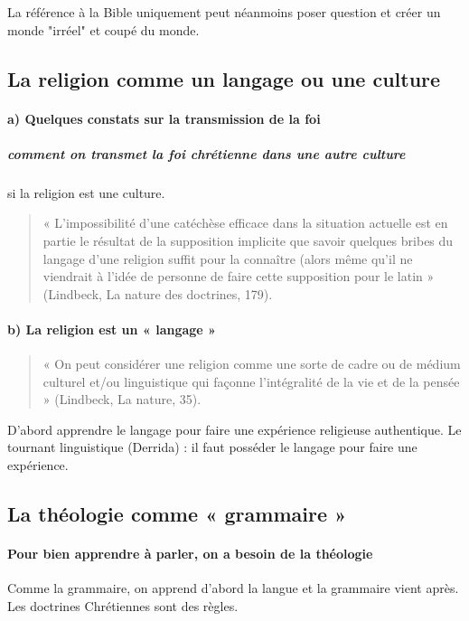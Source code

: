La référence à la Bible uniquement peut néanmoins poser question et créer un monde "irréel" et coupé du monde.


 
  \subsection{La religion comme un langage ou une culture}

\paragraph{a) Quelques constats sur la transmission de la foi}

\subparagraph{comment on transmet la foi chrétienne dans une autre culture} si la religion est une culture. 
\begin{quote}
    « L’impossibilité d’une catéchèse efficace dans la situation actuelle est en partie le résultat de la
supposition implicite que savoir quelques bribes du langage d’une religion suffit pour la connaître
(alors même qu’il ne viendrait à l’idée de personne de faire cette supposition pour le latin » (Lindbeck,
La nature des doctrines, 179).
\end{quote}

 \paragraph{b) La religion est un « langage »}

\begin{quote}
    « On peut considérer une religion comme une sorte de cadre ou de médium culturel et/ou linguistique
qui façonne l’intégralité de la vie et de la pensée » (Lindbeck, La nature, 35).
\end{quote}
D'abord apprendre le langage pour faire une expérience religieuse authentique. Le tournant linguistique (Derrida) : il faut posséder le langage pour faire une expérience.




 \subsection{La théologie comme « grammaire »}

 \paragraph{Pour bien apprendre à parler, on a besoin de la théologie} Comme la grammaire, on apprend d'abord la langue et la grammaire vient après. Les doctrines Chrétiennes sont des règles. 

